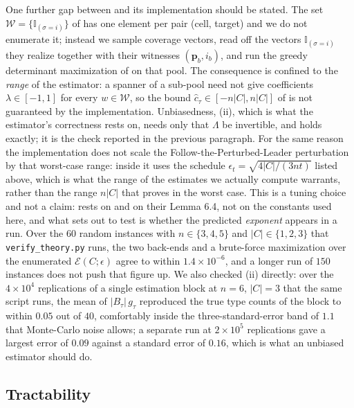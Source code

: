 \documentclass[letterpaper,9pt,twocolumn]{extarticle}
\newcommand{\pvec}{\mathbf{p}}
\newcommand{\cE}{\mathcal{E}}
\theoremstyle{plain}
\theoremstyle{definition}
\theoremstyle{remark}
\begin{document}
One further gap between  and its implementation should be
stated. The set $\mathcal{W}=\{\mathbb{I}_{(\sigma=i)}\}$ of
\citet[Section 6.3]{balcan2015} has one element per pair (cell, target) and
we do not enumerate it; instead we sample coverage vectors, read off the
vectors $\mathbb{I}_{(\sigma=i)}$ they realize together with their witnesses
$(\pvec_b,i_b)$, and run the greedy determinant maximization of
\citet{awerbuch2008} on that pool. The consequence is confined to the
\emph{range} of the estimator: a spanner of a sub-pool need not give
coefficients $\lambda\in[-1,1]$ for every $w\in\mathcal{W}$, so the bound
$\hat c_\tau\in[-n|C|,n|C|]$ of \citet[Lemma 6.4]{balcan2015} is not
guaranteed by the implementation. Unbiasedness, (ii),
which is what the estimator's correctness rests on, needs only that
$\Lambda$ be invertible, and holds exactly; it is the check reported in the
previous paragraph. For the same reason the implementation does not scale the
Follow-the-Perturbed-Leader perturbation by that worst-case range: inside
 it uses the schedule $\epsilon_t=\sqrt{4|C|/(3nt)}$ listed
above, which is what the range of the estimates we actually compute warrants,
rather than the range $n|C|$ that \citet[Lemma 6.4]{balcan2015} proves in the
worst case. This is a tuning choice and not a claim:  rests on
 and on their Lemma 6.4, not on the constants used here, and
what  sets out to test is whether the predicted
\emph{exponent} appears in a run. Over the $60$ random instances with
$n\in\{3,4,5\}$ and $|C|\in\{1,2,3\}$ that \texttt{verify\_theory.py} runs,
the two back-ends and a brute-force maximization over the enumerated
$\cE(C;\epsilon)$ agree to within $1.4\times10^{-6}$, and a longer run of
$150$ instances does not push that figure up. We also
checked (ii) directly: over the $4\times10^{4}$ replications
of a single estimation block at $n=6$, $|C|=3$ that the same script runs, the
mean of $|B_\tau|\,g_\tau$ reproduced the true type counts of the block to
within $0.05$ out of $40$, comfortably inside the three-standard-error band
of $1.1$ that Monte-Carlo noise allows; a separate run at $2\times10^{5}$
replications gave a largest error of $0.09$ against a standard error of
$0.16$, which is what an unbiased estimator should do.

\subsection{Tractability}
\label{sec:exp-tract}
\end{document}
